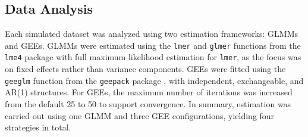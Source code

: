 \documentclass[stu]{apa7}
\begin{document}


\subsection{Data Analysis}

Each simulated dataset was analyzed using two estimation frameworks: GLMMs and GEEs. GLMMs were estimated using the \texttt{lmer} and \texttt{glmer} functions from the \texttt{lme4} package \parencite[version 1.1-36;][]{bates_fitting_2015} with full maximum likelihood estimation for \texttt{lmer}, as the focus was on fixed effects rather than variance components. GEEs were fitted using the \texttt{geeglm} function from the \texttt{geepack} package \parencite[version 1.3.12;][]{halekoh_r_2006}, with independent, exchangeable, and AR(1) structures. For GEEs, the maximum number of iterations was increased from the default 25 to 50 to support convergence. In summary, estimation was carried out using one GLMM and three GEE configurations, yielding four strategies in total.
\end{document}

